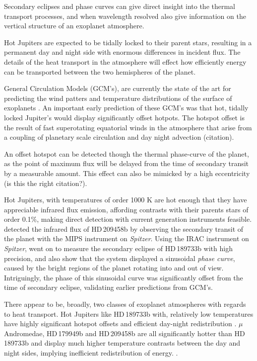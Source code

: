 \documentclass[a4paper,fleqn,usenatbib]{mnras}
\begin{document}
Secondary eclipses and phase curves can give direct insight into the thermal transport processes, and when wavelength resolved also give information on the vertical structure of an exoplanet atmosphere.

Hot Jupiters are expected to be tidally locked to their parent stars, resulting in a permanent day and night side with enormous differences in incident flux. The details of the heat transport in the atmosphere will effect how efficiently energy can be transported between the two hemispheres of the planet.

General Circulation Models (GCM's), are currently the state of the art for predicting the wind patters and temperature distributions of the surface of exoplanets \citep[e.g.][]{Showman2008}. An important early prediction of these GCM's was that hot, tidally locked Jupiter's would display significantly offset hotpots. The hotspot offset is the result of fast superotating equatorial winds in the atmosphere that arise from a coupling of planetary scale circulation and day night advection (citation).

An offset hotspot can be detected though the thermal phase-curve of the planet, as the point of maximum flux will be delayed from the time of secondary transit by a measurable amount. This effect can also be mimicked by a high eccentricity \citep{J.deWit2012a} (is this the right citation?). 

Hot Jupiters, with temperatures of order 1000 K are hot enough that they have appreciable infrared flux emission, affording contrasts with their parents stars of order 0.1\%, making direct detection with current generation instruments feasible. \citet{Deming2005} detected the infrared flux of HD\,209458b by observing the secondary transit of the planet with the MIPS instrument on \emph{Spitzer}. Using the IRAC instrument on \emph{Spitzer}, \citet{Knutson2007b} went on to measure the secondary eclipse of HD\,189733b with high precision, and also show that the system displayed a sinusoidal \emph{phase curve}, caused by the bright regions of the planet rotating into and out of view. Intriguingly, the phase of this sinusoidal curve was significantly offset from the time of secondary eclipse, validating earlier predictions from GCM's.

There appear to be, broadly, two classes of exoplanet atmospheres with regards to heat transport. Hot Jupiters like HD\,189733b with, relatively low temperatures have highly significant hotspot offsets and efficient day-night redistribution \citep{Knutson2007b}. $\mu$ Andromedae, HD\,179949b and HD\,209458b are all significantly hotter than HD\,189733b and display much higher temperature contrasts between the day and night sides, implying inefficient redistribution of energy. \citep{Harrington2006,Cowan2007,zellem2014}. 
\end{document}
